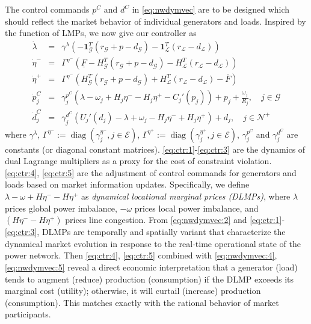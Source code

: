 \documentclass[journal,12pt,onecolumn,draftclsnofoot]{IEEEtran}
\newcommand{\diag}{\mathop{\mathrm{diag}}}
\begin{document}
The control commands $p^C$ and $d^C$ in \eqref{eq:nwdymvec} are to be designed which should reflect the market behavior of individual generators and loads. Inspired by the function of LMPs, we now give our controller as 
\begin{subequations}
	\begin{eqnarray}
	\label{eq:ctr:1}
	\dot \lambda & = & \gamma^\lambda \left( - \mathbf 1^T_\mathcal{G} (r_\mathcal{G}+p-d_\mathcal{G})  - \mathbf 1^T_\mathcal{L} (r_\mathcal{L}-d_\mathcal{L}) \right) \\
	\label{eq:ctr:2}
	\dot \eta^- & = & \Gamma^{\eta^-} \left(\underline{F} - H^T_{\mathcal{G}}(r_\mathcal{G}+p-d_\mathcal{G}) - H^T_\mathcal{L}(r_\mathcal{L}-d_\mathcal{L})  \right)   \\
	\label{eq:ctr:3}
	\dot \eta^+ & = & \Gamma^{\eta^-} \left( H^T_{\mathcal{G}}(r_\mathcal{G}+p-d_\mathcal{G}) + H^T_\mathcal{L}(r_\mathcal{L}-d_\mathcal{L}) - \overline{F}  \right)   \\	
	\label{eq:ctr:4}
	\dot p_j^C  & =&	\gamma_j^{p^C} \left(  \lambda -  \omega_j   +  H_j \eta^- - H_j \eta^+ - C_j'(p_j)   \right) + p_j+\frac{\omega_j }{R_j}  ,\quad j\in\mathcal{G}  \\
	\label{eq:ctr:5}
	\dot d_j^C & = & \gamma_j^{d^C} \left(U_j'(d_j)  -  \lambda +  \omega_j - H_j \eta^- +  H_j\eta^+    \right) + d_j, \quad  j\in\mathcal{N}^+
	\end{eqnarray}\label{eq:ctr}%
\end{subequations}
where $\gamma^\lambda$, $ \Gamma^{\eta^{-}}:=\diag(\gamma_j^{\eta^-}, j\in\mathcal{E})$, $ \Gamma^{\eta^{+}}:=\diag(\gamma_j^{\eta^+}, j\in\mathcal{E})$, $\gamma_j^{p^C}$ and $\gamma_j^{d^C}$ are constants (or diagonal constant matrices). \eqref{eq:ctr:1}-\eqref{eq:ctr:3} are the dynamics of dual Lagrange multipliers as a proxy for the cost of constraint violation. \eqref{eq:ctr:4}, \eqref{eq:ctr:5} are the adjustment of control commands for generators and loads based on market information updates. Specifically, we define $\lambda - \omega +H \eta^- - H\eta^+$ as \emph{dynamical locational marginal prices (DLMPs)}, where $\lambda$ prices global power imbalance, $-\omega$ prices local power imbalance, and $(H \eta^- - H\eta^+)$ prices line congestion. From \eqref{eq:nwdymvec:2} and \eqref{eq:ctr:1}-\eqref{eq:ctr:3}, DLMPs are temporally and spatially variant that characterize the dynamical market evolution in response to the real-time operational state of the power network. Then \eqref{eq:ctr:4}, \eqref{eq:ctr:5} combined with \eqref{eq:nwdymvec:4}, \eqref{eq:nwdymvec:5} reveal a direct economic interpretation that a generator (load) tends to augment (reduce) production (consumption) if the DLMP exceeds its marginal cost (utility); otherwise, it will curtail (increase) production (consumption). This matches exactly with the rational behavior of market participants.  
\end{document}
